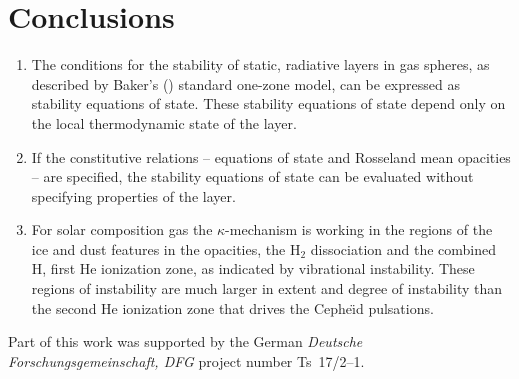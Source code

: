 \documentclass{aa}
\begin{document}
\section{Conclusions}

   \begin{enumerate}
      \item The conditions for the stability of static, radiative
         layers in gas spheres, as described by Baker's (\citeyear{baker})
         standard one-zone model, can be expressed as stability
         equations of state. These stability equations of state depend
         only on the local thermodynamic state of the layer.
      \item If the constitutive relations -- equations of state and
         Rosseland mean opacities -- are specified, the stability
         equations of state can be evaluated without specifying
         properties of the layer.
      \item For solar composition gas the $\kappa$-mechanism is
         working in the regions of the ice and dust features
         in the opacities, the $\mathrm{H}_2$ dissociation and the
         combined H, first He ionization zone, as
         indicated by vibrational instability. These regions
         of instability are much larger in extent and degree of
         instability than the second He ionization zone
         that drives the Cephe{\"\i}d pulsations.
   \end{enumerate}

\begin{acknowledgements}
      Part of this work was supported by the German
      \emph{Deut\-sche For\-schungs\-ge\-mein\-schaft, DFG\/} project
      number Ts~17/2--1.
\end{acknowledgements}

%
%



\end{document}
